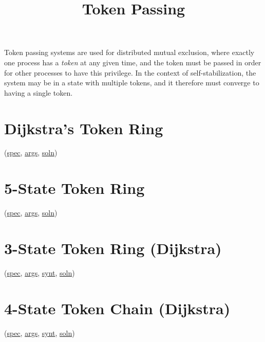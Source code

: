 
\title{Token Passing}
\date{}




Token passing systems are used for distributed mutual exclusion, where exactly one process has a \textit{token} at any given time, and the token must be passed in order for other processes to have this privilege.
In the context of self-stabilization, the system may be in a state with multiple tokens, and it therefore must converge to having a single token.

\tableofcontents

\section{Dijkstra's Token Ring}
\label{sec:TokenRingDijkstra}

(\href{\examplespec/TokenRingDijkstra.prot}{spec},
\href{\examplesett/TokenRingDijkstra.prot}{args},
\href{\examplesoln/TokenRingDijkstra.prot}{soln})

\section{5-State Token Ring}
\label{sec:TokenRingFiveState}

(\href{\examplespec/TokenRingFiveState.prot}{spec},
\href{\examplesett/TokenRingFiveState.args}{args},
\href{\examplesoln/TokenRingFiveState.prot}{soln})

\section{3-State Token Ring (Dijkstra)}
\label{sec:TokenRingThreeState}

(\href{\examplespec/TokenRingThreeState.prot}{spec},
\href{\examplesett/TokenRingThreeState.args}{args},
\href{\examplesynt/TokenRingThreeState.prot}{synt},
\href{\examplesoln/TokenRingThreeState.prot}{soln})

\section{4-State Token Chain (Dijkstra)}
\label{sec:TokenChainDijkstra}

(\href{\examplespec/TokenChainDijkstra.prot}{spec},
\href{\examplesett/TokenChainDijkstra.args}{args},
\href{\examplesynt/TokenChainDijkstra.prot}{synt},
\href{\examplesoln/TokenChainDijkstra.prot}{soln})

